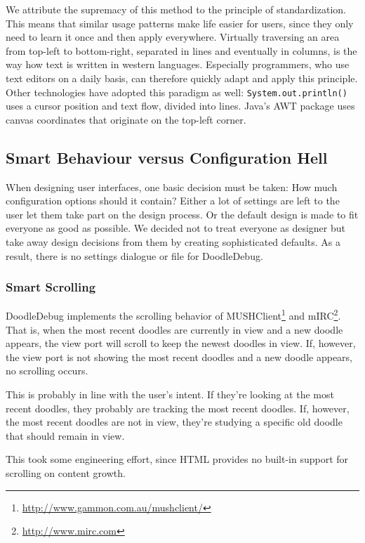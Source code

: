 \documentclass[english]{acm_proc_article-sp}
\newcommand\nes[1]{\nbc{nes}{#1}{blue}}
\begin{document}
We attribute the supremacy of this method to the principle of standardization\cite[pp. 
200--203]{Norm88a}. 
This means that similar usage patterns make life easier for users, since they only need to learn it once and then apply everywhere. 
Virtually traversing an area from top-left to bottom-right, separated in lines and eventually in columns, is the way how text is written in western languages. 
Especially programmers, who use text editors on a daily basis, can therefore quickly adapt and apply this principle. 
Other technologies have adopted this paradigm as well: \texttt{System.out.println()} uses a cursor position and text flow, divided into lines. 
Java's AWT package uses canvas coordinates that originate on the top-left corner.

\subsection{Smart Behaviour versus Configuration Hell}
When designing user interfaces, one basic decision must be taken: How much configuration options should it contain? Either a lot of settings are left to the user let them take part on the design process. 
Or the default design is made to fit everyone as good as possible. 
We decided not to treat everyone as designer
\cite[pp95ff]{Buxt07a}
\cite[p155]{Norm88a}
but take away design decisions from them by creating sophisticated defaults.
As a result, there is no settings dialogue or file for DoodleDebug. 
\nes{Nice!}
\subsubsection{Smart Scrolling}
DoodleDebug implements the scrolling behavior of MUSHClient\footnote{\url{http://www.gammon.com.au/mushclient/}} and mIRC\footnote{\url{http://www.mirc.com}}. 
That is, when the most recent doodles are currently in view and a new doodle appears, the view port will scroll to keep the newest doodles in view. 
If, however, the view port is not showing the most recent doodles and a new doodle appears, no scrolling occurs. 

This is probably in line with the user's intent. 
If they're looking at the most recent doodles, they probably are tracking the most recent doodles. 
If, however, the most recent doodles are not in view, they're studying a specific old doodle that should remain in view. 

This took some engineering effort, since HTML provides no built-in support for scrolling on content growth.
\end{document}
